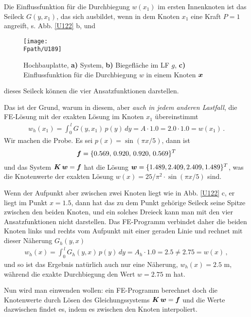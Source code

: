 Die Einflussfunktion f\"{u}r die Durchbiegung $w(x_1)$ im ersten Innenknoten ist  das Seileck $G(y,x_1)$, das sich ausbildet, wenn in dem Knoten $x_1$ eine Kraft $P = 1$ angreift, s. Abb. \ref{U122} b, und
\begin{figure}[tbp]
\centering
\if {} \sidecaption[t] \fi
\texttt{[image: \\Fpath/U189]}
\caption{Hochbauplatte, \textbf{a)} System,  \textbf{ b)} Biegefl\"{a}che im LF $g$, \textbf{ c)} Einflussfunktion f\"{u}r die Durchbiegung $w$ in einem Knoten $\mbox{\boldmath $x$}$} \label{U189}
\end{figure}%
dieses Seileck k\"{o}nnen die vier Ansatzfunktionen darstellen.

Das ist der Grund, warum in diesem, aber {\em auch in jedem anderen Lastfall\/}, die FE-L\"{o}sung mit der exakten L\"{o}sung im Knoten $x_1$ \"{u}bereinstimmt
\begin{align}
 w_h(x_1) = \int_0^{\,l} G(y,x_1)\,p(y)\,dy = A \cdot 1.0 = 2.0 \cdot 1.0 = w(x_1)\,.
\end{align}
Wir machen die Probe. Es sei $p(x) = \sin(\pi x/5)$, dann ist
\begin{align}
\mbox{\boldmath $f$} = \{0.569, \,0.920, \,0.920, \,0.569\}^T
\end{align}
und das System $\mbox{\boldmath $K$}\,\mbox{\boldmath $w$} = \mbox{\boldmath $f$}$ hat die L\"{o}sung $\mbox{\boldmath $w$} = \{1.489, 2.409, 2.409, 1.489\}^T$, was die Knotenwerte der exakten L\"{o}sung $w(x) = 25/\pi^2 \cdot \sin(\pi  x/5)$ sind.

Wenn der Aufpunkt aber zwischen zwei Knoten liegt wie in Abb. \ref{U122} c, er liegt im Punkt $x = 1.5$, dann hat das zu dem Punkt geh\"{o}rige Seileck seine Spitze zwischen den beiden Knoten, und ein solches Dreieck kann man mit den vier Ansatzfunktionen nicht darstellen. Das FE-Programm verbindet daher die beiden Knoten links und rechts vom Aufpunkt mit einer geraden Linie und rechnet mit dieser N\"{a}herung $G_h(y,x)$
\begin{align}
w_h(x) = \int_0^{\,l} G_h(y,x)\,p(y)\,dy = A_h \cdot 1.0 = 2.5 \neq 2.75 = w(x)\,,
\end{align}
und so ist das Ergebnis nat\"{u}rlich auch nur eine N\"{a}herung, $w_h(x) = 2.5$ m, w\"{a}hrend die exakte Durchbiegung den Wert $w = 2.75$ m hat.

Nun wird man einwenden wollen: ein FE-Programm berechnet doch die Knotenwerte durch L\"{o}sen des Gleichungssystems $\mbox{\boldmath $K$}\,\mbox{\boldmath $w$} = \mbox{\boldmath $f$}$ und die Werte dazwischen findet es, indem es zwischen den Knoten interpoliert.

